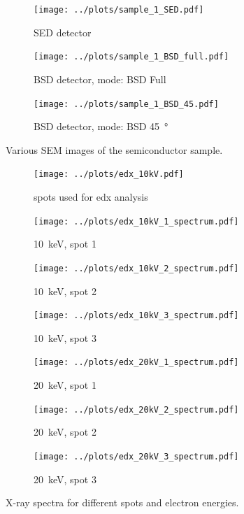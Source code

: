 \begin{figure}[t!]
	\centering
	\begin{subfigure}{0.7\linewidth}
		\centering
		\texttt{[image: ../plots/sample\_1\_SED.pdf]}
		\caption{SED detector}
		\label{subfig:sample_0_sed}
	\end{subfigure}
	\begin{subfigure}{0.7\linewidth}
		\centering
		\texttt{[image: ../plots/sample\_1\_BSD\_full.pdf]}
		\caption{BSD detector,  mode: BSD Full}
		\label{subfig:sample_0_bsd_full}
	\end{subfigure}
	\begin{subfigure}{0.7\linewidth}
		\centering
		\texttt{[image: ../plots/sample\_1\_BSD\_45.pdf]}
		\caption{BSD detector, mode: BSD \qty{45}{\degree}}
		\label{subfig:sample_0_bsd_45}
	\end{subfigure}
	\caption{Various SEM images of the semiconductor sample.}
	\label{fig:sample_0}
\end{figure}

\begin{figure}
	\centering
	\begin{subfigure}{0.7\linewidth}
		\centering
		\texttt{[image: ../plots/edx\_10kV.pdf]}
		\caption{spots used for \ac{edx} analysis}
		\label{subfig:edx_spots}
	\end{subfigure}
	\begin{subfigure}{0.45\linewidth}
		\centering
		\texttt{[image: ../plots/edx\_10kV\_1\_spectrum.pdf]}
		\caption{\qty{10}{\kilo \electronvolt}, spot 1}
		\label{subfig:10kV_1_spectrum}
	\end{subfigure}
	\begin{subfigure}{0.45\linewidth}
		\centering
		\texttt{[image: ../plots/edx\_10kV\_2\_spectrum.pdf]}
		\caption{\qty{10}{\kilo \electronvolt}, spot 2}
		\label{subfig:10kV_2_spectrum}
	\end{subfigure}
	\begin{subfigure}{0.45\linewidth}
		\centering
		\texttt{[image: ../plots/edx\_10kV\_3\_spectrum.pdf]}
		\caption{\qty{10}{\kilo \electronvolt}, spot 3}
		\label{subfig:10kV_3_spectrum}
	\end{subfigure}
	\begin{subfigure}{0.45\linewidth}
		\centering
		\texttt{[image: ../plots/edx\_20kV\_1\_spectrum.pdf]}
		\caption{\qty{20}{\kilo \electronvolt}, spot 1}
		\label{subfig:20kV_1_spectrum}
	\end{subfigure}
	\begin{subfigure}{0.45\linewidth}
		\centering
		\texttt{[image: ../plots/edx\_20kV\_2\_spectrum.pdf]}
		\caption{\qty{20}{\kilo \electronvolt}, spot 2}
		\label{subfig:20kV_2_spectrum}
	\end{subfigure}
	\begin{subfigure}{0.45\linewidth}
		\centering
		\texttt{[image: ../plots/edx\_20kV\_3\_spectrum.pdf]}
		\caption{\qty{20}{\kilo \electronvolt}, spot 3}
		\label{subfig:20kV_3_spectrum}
	\end{subfigure}
	\caption{X-ray spectra for different spots and electron energies.}
	\label{fig:edx_plots}
\end{figure}

